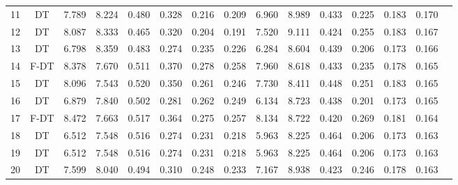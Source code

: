 \begin{longtable}{@{\hskip3pt}c@{\hskip3pt}c@{\hskip3pt}c@{\hskip3pt}c@{\hskip3pt}c@{\hskip3pt}c@{\hskip3pt}c@{\hskip3pt}c@{\hskip3pt}c@{\hskip3pt}c@{\hskip3pt}c@{\hskip3pt}c@{\hskip3pt}c@{\hskip3pt}c@{\hskip3pt}c}
         11 &             DT &             7.789 &       8.224 &         0.480 &       0.328 &       0.216 &        0.209 &               6.960 &       8.989 &         0.433 &       0.225 &       0.183 &        0.170 \\
         12 &             DT &             8.087 &       8.333 &         0.465 &       0.320 &       0.204 &        0.191 &               7.520 &       9.111 &         0.424 &       0.255 &       0.183 &        0.167 \\
         13 &             DT &             6.798 &       8.359 &         0.483 &       0.274 &       0.235 &        0.226 &               6.284 &       8.604 &         0.439 &       0.206 &       0.173 &        0.166 \\
         14 &           F-DT &             8.378 &       7.670 &         0.511 &       0.370 &       0.278 &        0.258 &               7.960 &       8.618 &         0.433 &       0.235 &       0.178 &        0.165 \\
         15 &             DT &             8.096 &       7.543 &         0.520 &       0.350 &       0.261 &        0.246 &               7.730 &       8.411 &         0.448 &       0.251 &       0.183 &        0.165 \\
         16 &             DT &             6.879 &       7.840 &         0.502 &       0.281 &       0.262 &        0.249 &               6.134 &       8.723 &         0.438 &       0.201 &       0.173 &        0.165 \\
         17 &           F-DT &             8.472 &       7.663 &         0.517 &       0.364 &       0.275 &        0.257 &               8.134 &       8.722 &         0.420 &       0.269 &       0.181 &        0.164 \\
         18 &             DT &             6.512 &       7.548 &         0.516 &       0.274 &       0.231 &        0.218 &               5.963 &       8.225 &         0.464 &       0.206 &       0.173 &        0.163 \\
         19 &             DT &             6.512 &       7.548 &         0.516 &       0.274 &       0.231 &        0.218 &               5.963 &       8.225 &         0.464 &       0.206 &       0.173 &        0.163 \\
         20 &             DT &             7.599 &       8.040 &         0.494 &       0.310 &       0.248 &        0.233 &               7.167 &       8.938 &         0.423 &       0.246 &       0.178 &        0.163 \\

\end{longtable}

